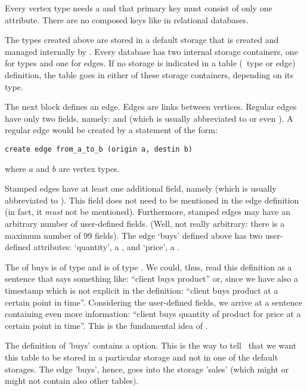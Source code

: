 Every vertex type needs a  and
that primary key must consist of only one attribute.
There are no composed keys like in relational
databases.

The types created above
are stored in a default storage
that is created and managed internally by \nowdb.
Every database has two internal storage containers,
one for types and one for edges. If no storage
is indicated in a table (\ie\ type or edge) definition,
the table goes in either of these storage containers,
depending on its type.

The next block defines an  edge.
Edges are links between vertices. Regular edges
have only two fields, namely: 
and  (which is usually abbreviated
to  or even ).
A regular edge would be created by a statement of the form:

\begin{sqlcode}
\begin{lstlisting}
create edge from_a_to_b (origin a, destin b) 
\end{lstlisting}
\end{sqlcode}

where $a$ and $b$ are vertex types.

Stamped edges have at least one additional field,
namely  (which is usually abbreviated
to ). This field does not need to be mentioned
in the edge definition (in fact, it \emph{must} not be
mentioned). Furthermore, stamped edges may have an
arbitrary number of user-defined fields.
(Well, not really arbitrary: there is a maximum number
of 99 fields).
The edge `buys' defined above has two user-defined
attributes: `quantity', a , and
`price', a .

The  of buys is of type
 and  is of type .
We could, thus, read this definition as a sentence
that says something like: ``client buys product'' or,
since we have also a timestamp which is not explicit
in the definition:
``client buys product at a certain point in time''.
Considering the user-defined fields,
we arrive at a sentence containing even more information:
``client buys quantity of product for price at a certain point in time''.
This is the fundamental idea of \nowdb.

The definition of 'buys' contains a  option.
This is the way to tell \nowdb\ that we want this table 
to be stored in a particular storage
and not in one of the default storages. The edge 'buys',
hence, goes into the storage 'sales' (which might or
might not contain also other tables).

